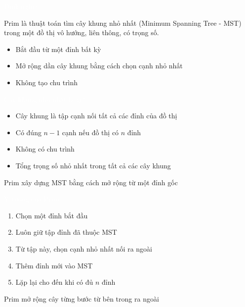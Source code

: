 \documentclass{beamer}
\title{\hlred{Prim Algorithm}}
\author{Group 3}
\date{\hlcyan{03/2026}}
\newcommand{\hlblue}[1]{\textcolor{myblue}{#1}}
\newcommand{\hlgreen}[1]{\textcolor{mygreen}{#1}}
\newcommand{\hlred}[1]{\textcolor{myred}{#1}}
\newcommand{\hlpurple}[1]{\textcolor{mypurple}{#1}}
\newcommand{\hlwhite}[1]{\textcolor{white}{#1}}
\begin{document}
\frame{\titlepage}


\begin{frame}{\hlwhite{Định nghĩa}}
\begin{tcolorbox}[title=\textbf{\hlwhite{Prim là gì?}}]
\hlblue{Prim} là thuật toán tìm \hlgreen{cây khung nhỏ nhất} \hlpurple{(Minimum Spanning Tree - MST)}
trong một đồ thị vô hướng, liên thông, có trọng số.
\end{tcolorbox}

\begin{itemize}
\item Bắt đầu từ một đỉnh bất kỳ
\item Mở rộng dần cây khung bằng cách chọn cạnh nhỏ nhất
\item Không tạo chu trình
\end{itemize}
\end{frame}


\begin{frame}{\hlwhite{Cây khung nhỏ nhất là gì?}}
\begin{itemize}
\item \hlblue{Cây khung} là tập cạnh nối tất cả các đỉnh của đồ thị
\item Có đúng $n-1$ cạnh nếu đồ thị có $n$ đỉnh
\item \hlred{Không có chu trình}
\item \hlgreen{Tổng trọng số nhỏ nhất} trong tất cả các cây khung
\end{itemize}

\begin{tcolorbox}
\centering
\hlpurple{Prim xây dựng MST bằng cách mở rộng từ một đỉnh gốc}
\end{tcolorbox}
\end{frame}


\begin{frame}{\hlwhite{Ý tưởng của Prim}}
\begin{enumerate}
\item Chọn một đỉnh bắt đầu
\item Luôn giữ tập đỉnh đã thuộc MST
\item Từ tập này, chọn cạnh nhỏ nhất nối ra ngoài
\item Thêm đỉnh mới vào MST
\item Lặp lại cho đến khi có đủ $n$ đỉnh
\end{enumerate}

\begin{tcolorbox}
\centering
\hlred{Prim mở rộng cây từng bước từ bên trong ra ngoài}
\end{tcolorbox}
\end{frame}
\end{document}

